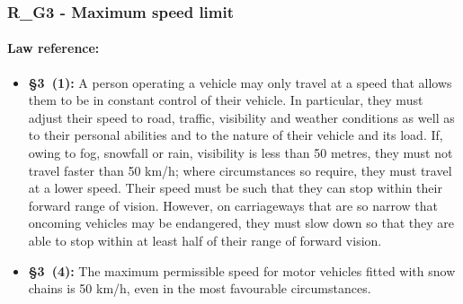 \subsubsection{R\_G3 - Maximum speed limit}
\paragraph{Law reference:}
\begin{itemize}
	\item \textbf{\stvo \S 3~(1):} A person operating a vehicle may only travel at a speed that allows them to be in constant control of their vehicle. In particular, they must adjust their speed to road, traffic, visibility and weather conditions as well as to their personal abilities and to the nature of their vehicle and its load. If, owing to fog, snowfall or rain, visibility is less than 50 metres, they must not travel faster than 50 km/h; where circumstances so require, they must travel at a lower speed. Their speed must be such that they can stop within their forward range of vision. However, on carriageways that are so narrow that oncoming vehicles may be endangered, they must slow down so that they are able to stop within at least half of their range of forward vision.
	
	\item \textbf{\stvo \S 3~(4):} The maximum permissible speed for motor vehicles fitted with snow chains is 50 km/h, even in the most favourable circumstances.
	

\end{itemize}
